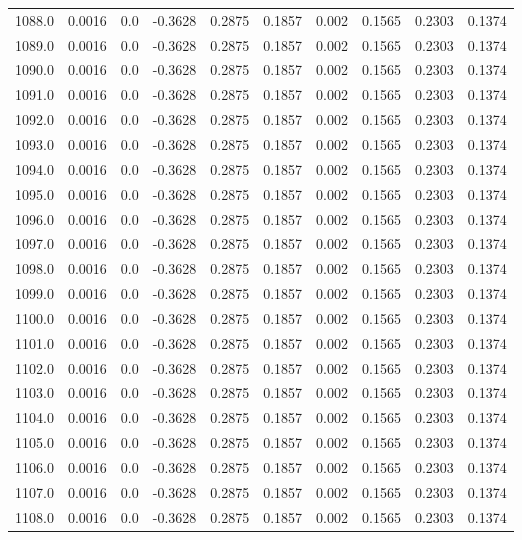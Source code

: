 \begin{longtable}{lrrrrrrrrr}
1088.0 & 0.0016 & 0.0 & -0.3628 & 0.2875 & 0.1857 & 0.002 & 0.1565 & 0.2303 & 0.1374 \\
1089.0 & 0.0016 & 0.0 & -0.3628 & 0.2875 & 0.1857 & 0.002 & 0.1565 & 0.2303 & 0.1374 \\
1090.0 & 0.0016 & 0.0 & -0.3628 & 0.2875 & 0.1857 & 0.002 & 0.1565 & 0.2303 & 0.1374 \\
1091.0 & 0.0016 & 0.0 & -0.3628 & 0.2875 & 0.1857 & 0.002 & 0.1565 & 0.2303 & 0.1374 \\
1092.0 & 0.0016 & 0.0 & -0.3628 & 0.2875 & 0.1857 & 0.002 & 0.1565 & 0.2303 & 0.1374 \\
1093.0 & 0.0016 & 0.0 & -0.3628 & 0.2875 & 0.1857 & 0.002 & 0.1565 & 0.2303 & 0.1374 \\
1094.0 & 0.0016 & 0.0 & -0.3628 & 0.2875 & 0.1857 & 0.002 & 0.1565 & 0.2303 & 0.1374 \\
1095.0 & 0.0016 & 0.0 & -0.3628 & 0.2875 & 0.1857 & 0.002 & 0.1565 & 0.2303 & 0.1374 \\
1096.0 & 0.0016 & 0.0 & -0.3628 & 0.2875 & 0.1857 & 0.002 & 0.1565 & 0.2303 & 0.1374 \\
1097.0 & 0.0016 & 0.0 & -0.3628 & 0.2875 & 0.1857 & 0.002 & 0.1565 & 0.2303 & 0.1374 \\
1098.0 & 0.0016 & 0.0 & -0.3628 & 0.2875 & 0.1857 & 0.002 & 0.1565 & 0.2303 & 0.1374 \\
1099.0 & 0.0016 & 0.0 & -0.3628 & 0.2875 & 0.1857 & 0.002 & 0.1565 & 0.2303 & 0.1374 \\
1100.0 & 0.0016 & 0.0 & -0.3628 & 0.2875 & 0.1857 & 0.002 & 0.1565 & 0.2303 & 0.1374 \\
1101.0 & 0.0016 & 0.0 & -0.3628 & 0.2875 & 0.1857 & 0.002 & 0.1565 & 0.2303 & 0.1374 \\
1102.0 & 0.0016 & 0.0 & -0.3628 & 0.2875 & 0.1857 & 0.002 & 0.1565 & 0.2303 & 0.1374 \\
1103.0 & 0.0016 & 0.0 & -0.3628 & 0.2875 & 0.1857 & 0.002 & 0.1565 & 0.2303 & 0.1374 \\
1104.0 & 0.0016 & 0.0 & -0.3628 & 0.2875 & 0.1857 & 0.002 & 0.1565 & 0.2303 & 0.1374 \\
1105.0 & 0.0016 & 0.0 & -0.3628 & 0.2875 & 0.1857 & 0.002 & 0.1565 & 0.2303 & 0.1374 \\
1106.0 & 0.0016 & 0.0 & -0.3628 & 0.2875 & 0.1857 & 0.002 & 0.1565 & 0.2303 & 0.1374 \\
1107.0 & 0.0016 & 0.0 & -0.3628 & 0.2875 & 0.1857 & 0.002 & 0.1565 & 0.2303 & 0.1374 \\
1108.0 & 0.0016 & 0.0 & -0.3628 & 0.2875 & 0.1857 & 0.002 & 0.1565 & 0.2303 & 0.1374 \\

\end{longtable}
